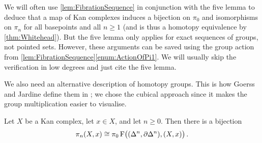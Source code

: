 \begin{rem}\label{rem:ExactnessInLowDegrees}
	We will often use \cref{lem:FibrationSequence} in conjunction with the five lemma to deduce that a map of Kan complexes induces a bijection on $\pi_0$ and isomorphisms on $\pi_n$ for all basepoints and all $n\geqslant 1$ (and is thus a homotopy equivalence by \cref{thm:Whitehead}). But the five lemma only applies for exact sequences of groups, not pointed sets. However, these arguments can be saved using the group action from \cref{lem:FibrationSequence}\cref{enum:ActionOfPi1}. We will usually skip the verification in low degrees and just cite the five lemma.
\end{rem}
We also need an alternative description of homotopy groups. This is how Goerss and Jardine define them in \cite[\S \href{http://dodo.pdmi.ras.ru/~topology/books/goerss-jardine.pdf\#page=37}{I.7}]{GoerssJardine}; we chose the cubical approach since it makes the group multiplication easier to visualise.
\begin{lem}\label{lem:HomotopyGroupsSimplex}
	Let $X$ be a Kan complex, let $x\in X$, and let $n\geqslant 0$. Then there is a bijection
	\begin{equation*}
		\pi_n(X,x)\cong \pi_0\operatorname{F}\bigl((\Delta^n,\partial\Delta^n),(X,x)\bigr)\,.
	\end{equation*}
\end{lem}
